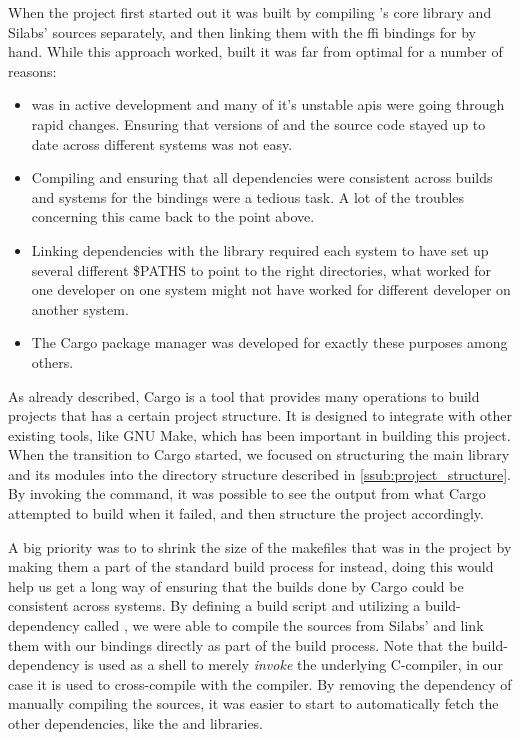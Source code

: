 When the project first started out it was built by compiling {\rust}'s core library and Silabs' {\emlib} {\C} sources separately, and then linking them with the \gls{ffi} bindings for {\emlib} by hand.
While this approach worked, built it was far from optimal for a number of reasons:

\begin{itemize}
    \item {\rust} was in active development and many of it's unstable \glspl{api} were going through rapid changes. Ensuring that versions of {\rustc} and the {\rust} source code stayed up to date across different systems was not easy.
    \item Compiling and ensuring that all dependencies were consistent across builds and systems for the bindings were a tedious task. A lot of the troubles concerning this came back to the point above.
    \item Linking dependencies with the library required each system to have set up several different \$PATHS to point to the right directories, what worked for one developer on one system might not have worked for different developer on another system.
    \item The Cargo package manager was developed for exactly these purposes among others.
\end{itemize}

As already described, Cargo is a tool that provides many operations to build {\rust} projects that has a certain project structure.
It is designed to integrate with other existing tools, like GNU Make, which has been important in  building this project.
When the transition to Cargo started, we focused on structuring the main library and its modules into the directory structure described in \autoref{ssub:project_structure}.
By invoking the  command, it was possible to see the output from what Cargo attempted to build when it failed, and then structure the project accordingly.

A big priority was to to shrink the size of the makefiles that was in the project by making them a part of the standard build process for {\emlib} instead, doing this would help us get a long way of ensuring that the builds done by Cargo could be consistent across systems.
By defining a {\rust} build script and utilizing a {\rust} build-dependency called  \cite{web:cargo_gcc}, we were able to compile the {\C} sources from Silabs' {\emlib} and link them with our bindings directly as part of the build process.
Note that the  build-dependency is used as a shell to merely \emph{invoke} the underlying C-compiler, in our case it is used to cross-compile with the {\armgcc} compiler.
By removing the dependency of manually compiling the {\C} sources, it was easier to start to automatically fetch the other dependencies, like the {\core} and  libraries.

